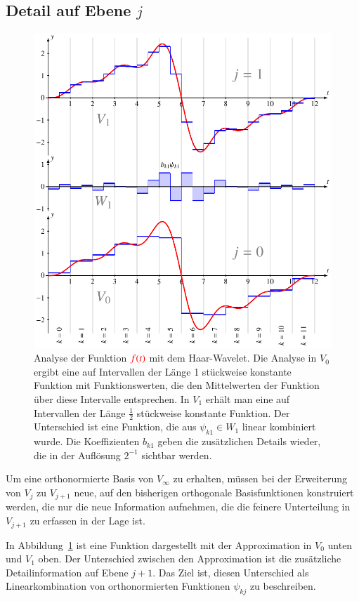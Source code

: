 \subsection{Detail auf Ebene $j$}
\begin{figure}
\centering
\includegraphics{chapters/3-haar/images/detail.pdf}
\caption{Analyse der Funktion $\color{red}f(t)$ mit dem Haar-Wavelet.
Die Analyse in $V_0$ ergibt eine auf Intervallen der Länge 1 stückweise
konstante Funktion mit Funktionswerten, die den Mittelwerten der Funktion
über diese Intervalle entsprechen.
In $V_1$ erhält man eine auf Intervallen der Länge $\frac12$ stückweise
konstante Funktion.
Der Unterschied ist eine Funktion, die aus $\psi_{k1}\in W_1$ linear
kombiniert wurde.
Die Koeffizienten $b_{k1}$ geben die zusätzlichen Details wieder,
die in der Auflösung $2^{-1}$ sichtbar werden.
\label{haar:figure:detail}}
\end{figure}
Um eine orthonormierte Basis von $V_\infty$ zu erhalten, müssen
bei der Erweiterung von $V_j$ zu $V_{j+1}$ neue, auf den bisherigen
orthogonale Basisfunktionen konstruiert werden, die nur die neue
Information aufnehmen, die die feinere Unterteilung in $V_{j+1}$
zu erfassen in der Lage ist.

In Abbildung~\ref{haar:figure:detail} ist eine Funktion dargestellt mit
der Approximation in $V_0$ unten und $V_1$ oben.
Der Unterschied zwischen den Approximation ist die zusätzliche
Detailinformation auf Ebene $j+1$.
Das Ziel ist, diesen Unterschied als Linearkombination von orthonormierten
Funktionen $\psi_{kj}$ zu beschreiben.

